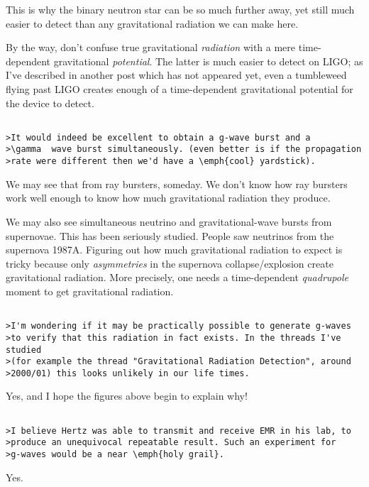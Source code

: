 This is why the binary neutron star can be so much further away,
yet still much easier to detect than any gravitational radiation
we can make here.

By the way, don't confuse true gravitational \emph{radiation} with a 
mere time-dependent gravitational \emph{potential}.  The latter is
much easier to detect on LIGO; as I've described in another
post which has not appeared yet, even a tumbleweed flying past 
LIGO creates enough of a time-dependent gravitational potential 
for the device to detect.


\begin{verbatim}

>It would indeed be excellent to obtain a g-wave burst and a 
>\gamma  wave burst simultaneously. (even better is if the propagation
>rate were different then we'd have a \emph{cool} yardstick).
\end{verbatim}
    
We may see that from \gamma  ray bursters, someday.  We don't
know how \gamma  ray bursters work well enough to know how much
gravitational radiation they produce.

We may also see simultaneous neutrino and gravitational-wave
bursts from supernovae.  This has been seriously studied.  People
saw neutrinos from the supernova 1987A.  Figuring out how much
gravitational radiation to expect is tricky because only \emph{asymmetries}
in the supernova collapse/explosion create gravitational radiation.  
More precisely, one needs a time-dependent \emph{quadrupole} moment
to get gravitational radiation.


\begin{verbatim}

>I'm wondering if it may be practically possible to generate g-waves
>to verify that this radiation in fact exists. In the threads I've studied
>(for example the thread "Gravitational Radiation Detection", around 
>2000/01) this looks unlikely in our life times. 
\end{verbatim}
    
Yes, and I hope the figures above begin to explain why!


\begin{verbatim}

>I believe Hertz was able to transmit and receive EMR in his lab, to 
>produce an unequivocal repeatable result. Such an experiment for
>g-waves would be a near \emph{holy grail}.
\end{verbatim}
    

Yes.


